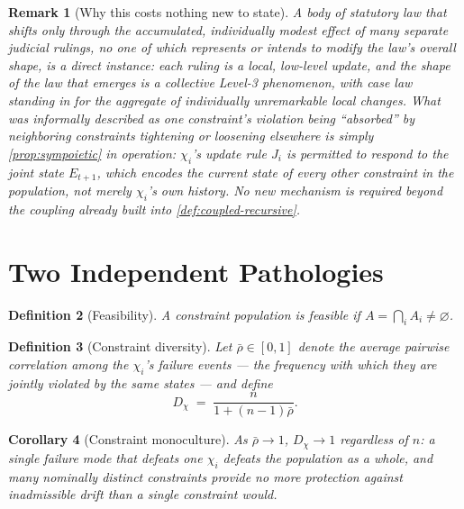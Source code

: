 \documentclass[12pt]{report}
\newtheorem{definition}{Definition}[section]
\newtheorem{corollary}[definition]{Corollary}
\newtheorem{remark}[definition]{Remark}
\begin{document}
\begin{remark}[Why this costs nothing new to state]
A body of statutory law that shifts only through the accumulated,
individually modest effect of many separate judicial rulings, no one of
which represents or intends to modify the law's overall shape, is a
direct instance: each ruling is a local, low-level update, and the shape
of the law that emerges is a collective Level-3 phenomenon, with case law
standing in for the aggregate of individually unremarkable local
changes. What was informally described as one constraint's violation
being ``absorbed'' by neighboring constraints tightening or loosening
elsewhere is simply \cref{prop:sympoietic} in operation: $\chi_i$'s
update rule $J_i$ is permitted to respond to the joint state $E_{t+1}$,
which encodes the current state of every other constraint in the
population, not merely $\chi_i$'s own history. No new mechanism is
required beyond the coupling already built into
\cref{def:coupled-recursive}.
\end{remark}

\section{Two Independent Pathologies}

\begin{definition}[Feasibility]
A constraint population is \emph{feasible} if $A = \bigcap_i A_i \neq
\varnothing$.
\end{definition}

\begin{definition}[Constraint diversity]
Let $\bar\rho \in [0,1]$ denote the average pairwise correlation among
the $\chi_i$'s failure events --- the frequency with which they are
jointly violated by the same states --- and define
\[
D_\chi \;=\; \frac{n}{1 + (n-1)\bar\rho}.
\]
\end{definition}

\begin{corollary}[Constraint monoculture]
As $\bar\rho \to 1$, $D_\chi \to 1$ regardless of $n$: a single failure
mode that defeats one $\chi_i$ defeats the population as a whole, and
many nominally distinct constraints provide no more protection against
inadmissible drift than a single constraint would.
\end{corollary}
\end{document}
